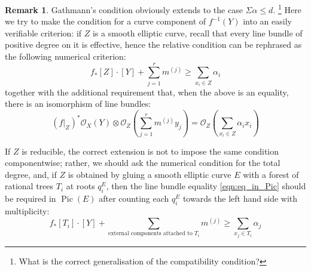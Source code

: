 \documentclass[11pt]{amsart}
\newcommand{\basenote}[1]{\footnote{\color{red}#1}}
\newcommand{\OO}{\mathcal{O}}
\newcommand{\Pic}{\operatorname{Pic}}
\theoremstyle{definition}
\theoremstyle{definition}
\newtheorem{remark}[thm]{Remark}
\begin{document}
\begin{remark} Gathmann's condition obviously extends to the case $\Sigma \alpha \leq d$. \basenote{What is the correct generalisation of the compatibility condition?} Here we try to make the condition for a curve component of $f^{-1}(Y)$ into an easily verifiable criterion: if $Z$ is a smooth elliptic curve, recall that every line bundle of positive degree on it is effective, hence the relative condition can be rephrased as the following numerical criterion:
\begin{equation*} f_*[Z]\cdot [Y]+\sum_{j=1}^r m^{(j)}\geq \sum_{x_i\in Z}\alpha_i \end{equation*}
together with the additional requirement that, when the above is an equality, there is an isomorphism of line bundles:
\begin{equation}\label{eqn:eq_in_Pic}
(f|_{Z})^*\OO_X(Y) \otimes \OO_Z\left(\sum_{j=1}^r m^{(j)}y_j\right)=\OO_Z\left(\sum_{x_i\in Z}\alpha_ix_i\right) 
\end{equation}
 
If $Z$ is reducible, the correct extension is not to impose the same condition componentwise; rather, we should ask the numerical condition for the total degree, and, if $Z$ is obtained by gluing a smooth elliptic curve $E$ with a forest of rational trees $T_i$ at roots $q^E_i$, then the line bundle equality \eqref{eqn:eq_in_Pic} should be required in $\Pic(E)$ after counting each $q^E_i$ towards the left hand side with multiplicity:
\[f_*[T_i]\cdot [Y]+\sum_{\text{external components attached to $T_i$}} m^{(j)} \geq \sum_{x_j\in T_i}\alpha_j\]
\end{remark}
\end{document}
